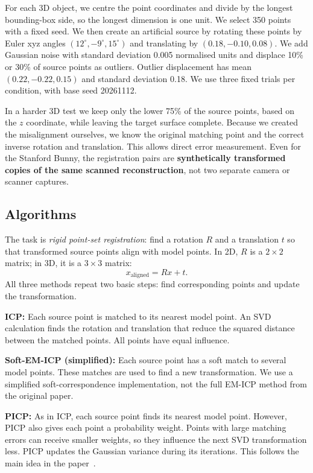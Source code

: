 \documentclass[11pt,a4paper]{article}
\begin{document}
For each 3D object, we centre the point coordinates and divide by the longest
bounding-box side, so the longest dimension is one unit. We select 350 points
with a fixed seed. We then create an artificial source by rotating these
points by Euler xyz angles $(12^\circ,-9^\circ,15^\circ)$ and translating by
$(0.18,-0.10,0.08)$. We add Gaussian noise with standard deviation 0.005
normalised units and displace 10\% or 30\% of source points as outliers.
Outlier displacement has mean $(0.22,-0.22,0.15)$ and standard deviation
0.18. We use three fixed trials per condition, with base seed 20261112.

In a harder 3D test we keep only the lower 75\% of the source points, based
on the $z$ coordinate, while leaving the target surface complete. Because we
created the misalignment ourselves, we know the original matching point and
the correct inverse rotation and translation. This allows direct error
measurement. Even for the Stanford Bunny, the registration pairs are
\textbf{synthetically transformed copies of the same scanned reconstruction},
not two separate camera or scanner captures.

\subsection{Algorithms}
The task is \emph{rigid point-set registration}: find a rotation $R$ and a
translation $t$ so that transformed source points align with model points.
In 2D, $R$ is a $2\times 2$ matrix; in 3D, it is a $3\times 3$ matrix:
\begin{equation}
  x_{\mathrm{aligned}} = Rx + t.
\end{equation}
All three methods repeat two basic steps: find corresponding points and update
the transformation.

\textbf{ICP:} Each source point is matched to its nearest model point. An SVD
calculation finds the rotation and translation that reduce the squared distance
between the matched points. All points have equal influence.

\textbf{Soft-EM-ICP (simplified):} Each source point has a soft match to several
model points. These matches are used to find a new transformation. We use a
simplified soft-correspondence implementation, not the full EM-ICP method from
the original paper.

\textbf{PICP:} As in ICP, each source point finds its nearest model point.
However, PICP also gives each point a probability weight. Points with large
matching errors can receive smaller weights, so they influence the next SVD
transformation less. PICP updates the Gaussian variance during its iterations.
This follows the main idea in the paper~\cite{liu2014}.
\end{document}
